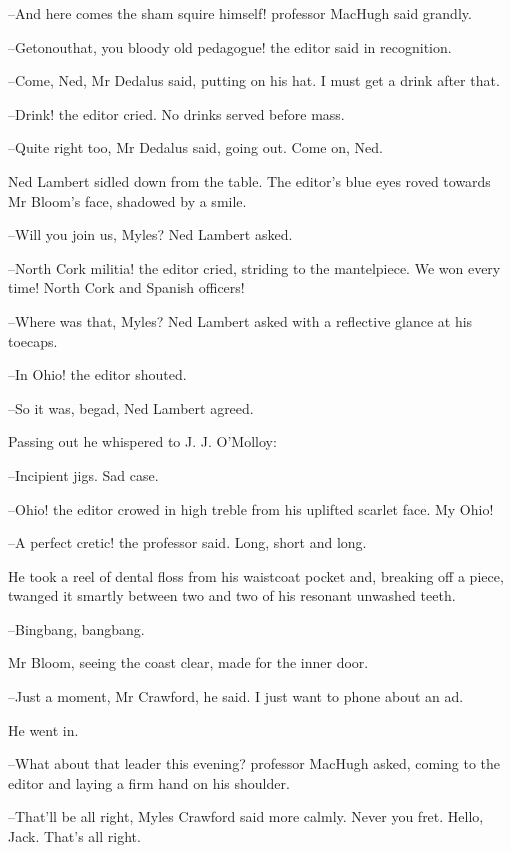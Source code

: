 --And here comes the sham squire himself! professor MacHugh said grandly.

--Getonouthat, you bloody old pedagogue! the editor said in recognition.

--Come, Ned, Mr Dedalus said, putting on his hat. I must get a drink
after that.

--Drink! the editor cried. No drinks served before mass.

--Quite right too, Mr Dedalus said, going out. Come on, Ned.

Ned Lambert sidled down from the table. The editor's blue eyes roved
towards Mr Bloom's face, shadowed by a smile.

--Will you join us, Myles? Ned Lambert asked.



--North Cork militia! the editor cried, striding to the mantelpiece. We
won every time! North Cork and Spanish officers!

--Where was that, Myles? Ned Lambert asked with a reflective glance at
his toecaps.

--In Ohio! the editor shouted.

--So it was, begad, Ned Lambert agreed.

Passing out he whispered to J. J. O'Molloy:

--Incipient jigs. Sad case.

--Ohio! the editor crowed in high treble from his uplifted scarlet face.
My Ohio!

--A perfect cretic! the professor said. Long, short and long.



He took a reel of dental floss from his waistcoat pocket and, breaking
off a piece, twanged it smartly between two and two of his resonant
unwashed teeth.

--Bingbang, bangbang.

Mr Bloom, seeing the coast clear, made for the inner door.

--Just a moment, Mr Crawford, he said. I just want to phone about an ad.

He went in.

--What about that leader this evening? professor MacHugh asked, coming
to the editor and laying a firm hand on his shoulder.

--That'll be all right, Myles Crawford said more calmly. Never you fret.
Hello, Jack. That's all right.

